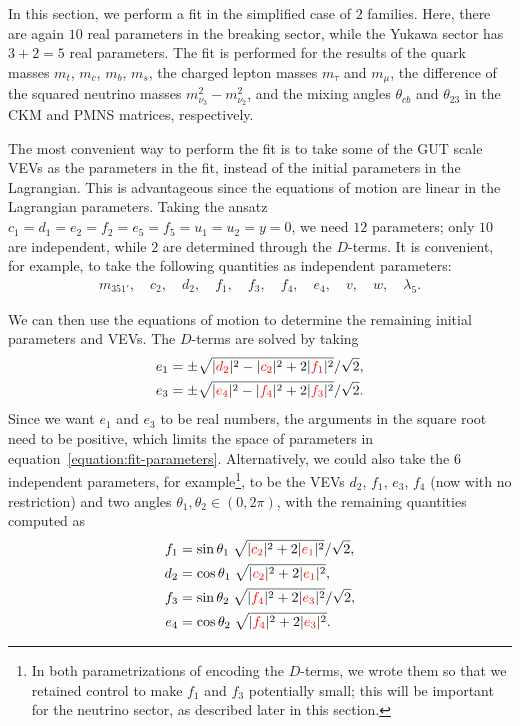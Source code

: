 \documentclass[a4paper,12pt]{article}
\def\RED{\textcolor{red}}
\begin{document}
In this section, we perform a fit in the simplified case of $2$ families. Here, there are again $10$ real parameters in the breaking sector, while the Yukawa sector has $3+2=5$ real parameters. The fit is performed for the results of the quark masses $m_{t}$, $m_{c}$, $m_{b}$, $m_{s}$, the charged lepton masses $m_{\tau}$ and $m_{\mu}$, the difference of the squared neutrino masses $m_{\nu_3}^2-m_{\nu_2}^2$, and the mixing angles $\theta_{cb}$ and $\theta_{23}$ in the CKM and PMNS matrices, respectively.


The most convenient way to perform the fit is to take some of the GUT scale VEVs as the parameters in the fit, instead of the initial parameters in the Lagrangian. This is advantageous since the equations of motion are linear in the Lagrangian parameters. Taking the ansatz $c_1=d_1=e_2=f_2=e_5=f_5=u_1=u_2=y=0$, we need $12$ parameters; only $10$ are independent, while $2$ are determined through the $D$-terms. It is convenient, for example, to take the following quantities as independent parameters:
\begin{align}
m_{351'},\quad c_2,\quad d_2,\quad f_1,\quad f_3,\quad f_4,\quad e_4,\quad v,\quad w,\quad \lambda_5.\label{equation:fit-parameters}
\end{align}

We can then use the equations of motion to determine the remaining initial parameters and VEVs. The $D$-terms are solved by taking
    \begin{align}
    \label{d2}
    e_1&= \pm\sqrt{|\RED{d_2}|^2 - |\RED{c_2}|^2 + 2 |\RED{f_1}|^2}/\sqrt{2},\\
    \label{e4}
    e_3&= \pm\sqrt{|\RED{e_4}|^2 - |\RED{f_4}|^2 + 2 |\RED{f_3}|^2}/\sqrt{2}.
    \end{align}
\noindent
Since we want $e_1$ and $e_3$ to be real numbers, the arguments in the square root need to be positive, which limits the space of parameters in equation~\eqref{equation:fit-parameters}. Alternatively, we could also take the $6$ independent parameters, for example\footnote{In both parametrizations of encoding the $D$-terms, we wrote them so that we retained control to make $f_1$ and $f_3$ potentially small; this will be important for the neutrino sector, as described later in this section.}, to be the VEVs $d_2$, $f_1$, $e_3$, $f_4$ (now with no restriction) and two angles $\theta_{1},\theta_2\in (0,2\pi)$, with the remaining quantities computed as
\begin{align}
f_1&=\sin\theta_1\;\sqrt{|\RED{c_2}|^2 + 2 |\RED{e_1}|^2}/\sqrt{2},\\
d_2&=\cos\theta_1\;\sqrt{|\RED{c_2}|^2 + 2 |\RED{e_1}|^2},\\
f_3&=\sin\theta_2\;\sqrt{|\RED{f_4}|^2 + 2 |\RED{e_3}|^2}/\sqrt{2},\\
\label{ee4}
e_4&=\cos\theta_2\;\sqrt{|\RED{f_4}|^2 + 2 |\RED{e_3}|^2}.
\end{align}
\end{document}
